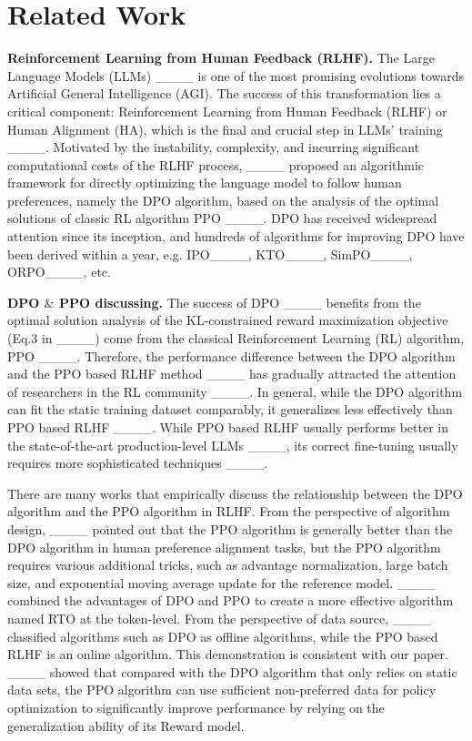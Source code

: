 \section{Related Work}
\label{appendix_related_work}
\textbf{Reinforcement Learning from Human Feedback (RLHF).} The Large Language Models (LLMs) ____ is one of the most promising evolutions towards Artificial General Intelligence (AGI). The success of this transformation lies a critical component: Reinforcement Learning from Human Feedback (RLHF) or Human Alignment (HA), which is the final and crucial step in LLMs' training ____. Motivated by the instability, complexity, and incurring significant computational costs of the RLHF process, ____ proposed an algorithmic framework for directly optimizing the language model to follow human preferences, namely the DPO algorithm, based on the analysis of the optimal solutions of classic RL algorithm PPO ____. DPO has received widespread attention since its inception, and hundreds of algorithms for improving DPO have been derived within a year, e.g. IPO____, KTO____, SimPO____, ORPO____, etc. 

\textbf{DPO $\&$ PPO discussing.}
The success of DPO ____ benefits from the optimal solution analysis of the KL-constrained reward maximization objective (Eq.3 in ____) come from the classical Reinforcement Learning (RL) algorithm, PPO ____. Therefore, the performance difference between the DPO algorithm and the PPO based RLHF method ____ has gradually attracted the attention of researchers in the RL community ____. In general, while the DPO algorithm can fit the static training dataset comparably, it generalizes less effectively than PPO based RLHF ____. While PPO based RLHF usually performs better in the state-of-the-art production-level LLMs ____, its correct fine-tuning usually requires more sophisticated techniques ____.

There are many works that empirically discuss the relationship between the DPO algorithm and the PPO algorithm in RLHF. From the perspective of algorithm design, ____ pointed out that the PPO algorithm is generally better than the DPO algorithm in human preference alignment tasks, but the PPO algorithm requires various additional tricks, such as advantage normalization, large batch size, and exponential moving average update for the reference model. ____ combined the advantages of DPO and PPO to create a more effective algorithm named RTO at the token-level. From the perspective of data source, ____ classified algorithms such as DPO as offline algorithms, while the PPO based RLHF is an online algorithm. This demonstration is consistent with our paper. ____ showed that compared with the DPO algorithm that only relies on static data sets, the PPO algorithm can use sufficient non-preferred data for policy optimization to significantly improve performance by relying on the generalization ability of its Reward model.